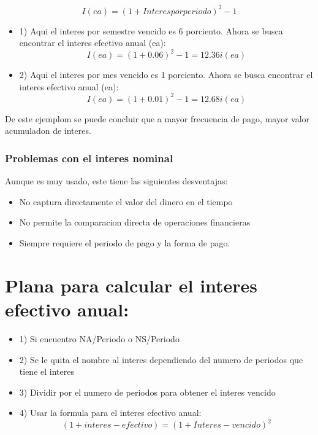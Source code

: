 \documentclass[12pt]{article}
\begin{document}
\begin{equation}
 I(ea)=(1+Interespor periodo)^2-1
\end{equation}

\begin{itemize}
 \item{1)} 
Aqui el interes por semestre vencido es 6 porciento. Ahora se busca encontrar el interes efectivo anual (ea):
\begin{equation}
 I(ea)=(1+0.06)^2-1=12.36 i(ea)
\end{equation}
  \item{2)} 
Aqui el interes por mes vencido es 1 porciento. Ahora se busca encontrar el interes efectivo anual (ea):
\begin{equation}
 I(ea)=(1+0.01)^2-1=12.68 i(ea)
\end{equation}
\end{itemize}
De este ejemplom se puede concluir que a mayor frecuencia de pago, mayor valor acumuladon de interes.
\subsubsection{Problemas con el interes nominal}
Aunque es muy usado, este tiene las siguientes desventajas:
\begin{itemize}
 \item No captura directamente el valor del dinero en el tiempo
 \item No permite la comparacion directa de operaciones financieras
 \item Siempre requiere el periodo de pago y la forma de pago.

\end{itemize}

\section{Plana para calcular el interes efectivo anual:}
\begin{itemize}
 \item{1)} Si encuentro NA/Periodo o NS/Periodo
 \item{2)} Se le quita el nombre al interes dependiendo del numero de periodos que tiene el interes
 \item{3)} Dividir por el numero de periodos para obtener el interes vencido
 \item{4)} Usar la formula para el interes efectivo anual:
\begin{equation}
 (1+ interes-efectivo)=(1+Interes-vencido)^2
\end{equation}
\end{itemize}
\end{document}
